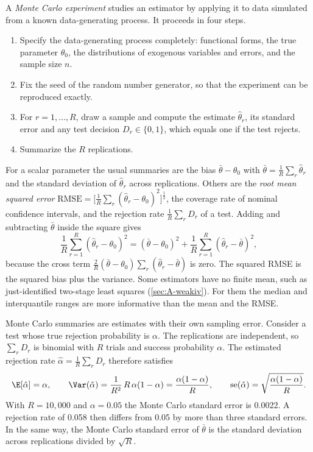 A \emph{Monte Carlo experiment} studies an estimator by applying it to data simulated from a known
data-generating process. It proceeds in four steps.
\begin{enumerate}[label=(\arabic*)]
\item Specify the data-generating process completely: functional forms, the true parameter $\theta_0$, the
  distributions of exogenous variables and errors, and the sample size $n$.
\item Fix the seed of the random number generator, so that the experiment can be reproduced exactly.
\item For $r = 1, \dots, R$, draw a sample and compute the estimate $\hat\theta_r$, its standard error and
  any test decision $D_r \in \{0, 1\}$, which equals one if the test rejects.
\item Summarize the $R$ replications.
\end{enumerate}
For a scalar parameter the usual summaries are the bias $\bar\theta - \theta_0$ with
$\bar\theta = \frac{1}{R}\sum_r\hat\theta_r$ and the standard deviation of $\hat\theta_r$ across replications.
Others are the \emph{root mean squared error}
$\mathrm{RMSE} = \bigl[\frac{1}{R}\sum_r(\hat\theta_r - \theta_0)^2\bigr]^{\frac{1}{2}}$, the coverage rate of
nominal confidence intervals, and the rejection rate $\frac{1}{R}\sum_r D_r$ of a test. Adding and
subtracting $\bar\theta$ inside the square gives
\begin{equation*}
\frac{1}{R}\sum_{r=1}^{R}(\hat\theta_r - \theta_0)^2
= (\bar\theta - \theta_0)^2 + \frac{1}{R}\sum_{r=1}^{R}(\hat\theta_r - \bar\theta)^2 ,
\end{equation*}
because the cross term $\frac{2}{R}(\bar\theta - \theta_0)\sum_r(\hat\theta_r - \bar\theta)$ is zero. The
squared RMSE is the squared bias plus the variance. Some estimators have no finite mean, such as
just-identified two-stage least squares (\cref{sec:A-weakiv}). For them the median and interquantile ranges
are more informative than the mean and the RMSE.

Monte Carlo summaries are estimates with their own sampling error. Consider a test whose true rejection
probability is $\alpha$. The replications are independent, so $\sum_r D_r$ is binomial with $R$ trials and
success probability $\alpha$. The estimated rejection rate $\hat\alpha = \frac{1}{R}\sum_r D_r$ therefore
satisfies
\begin{equation}\label{eq:A-mc-se}
\E[\hat\alpha] = \alpha, \qquad
\Var(\hat\alpha) = \frac{1}{R^2}\,R\,\alpha(1 - \alpha) = \frac{\alpha(1 - \alpha)}{R}, \qquad
\mathrm{se}(\hat\alpha) = \sqrt{\frac{\alpha(1 - \alpha)}{R}} .
\end{equation}
With $R = 10{,}000$ and $\alpha = 0.05$ the Monte Carlo standard error is 0.0022. A rejection rate of 0.058
then differs from 0.05 by more than three standard errors. In the same way, the Monte Carlo standard error
of $\bar\theta$ is the standard deviation across replications divided by $\sqrt{R}$.

